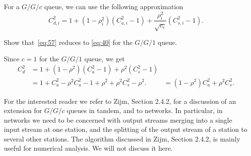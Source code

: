 For a $G/G/c$ queue, we can use the following approximation
\begin{equation}\label{eq:57}
  C_{d,i}^2 = 1 + (1-\rho_i^2)(C_{a,i}^2-1) + \frac{\rho_i^2}{\sqrt{c_i}}(C_{s,i}^2-1).
\end{equation}

\begin{exercise}
  Show that~\eqref{eq:57} reduces to \eqref{eq:40} for the $G/G/1$ queue.
  \begin{solution}
    Since $c=1$ for the $G/G/1$ queue, we get
\begin{align*}
  C_{d}^2 
&= 1 + (1-\rho^2)(C_{a}^2-1) + \rho^2(C_{s}^2-1) \\
&= 1 + C_a^2 - \rho^2 C_{a}^2 -1 + \rho^2  + \rho^2 C_{s}^2 -\rho^2.
&= (1-\rho^2) C_a^2  + \rho^2 C_{s}^2.
\end{align*}
  \end{solution}
\end{exercise}


For the interested reader we refer to Zijm, Section 2.4.2, for a discussion of an extension for $G/G/c$ queues in tandem, and to networks. In particular, in networks we need to be concerned with output streams merging into a single input stream at one station, and the splitting of the output stream of a station to several other stations. The algorithm discussed in Zijm, Section 2.4.2, is mainly useful for numerical analysis. We will not discuss it here. 







